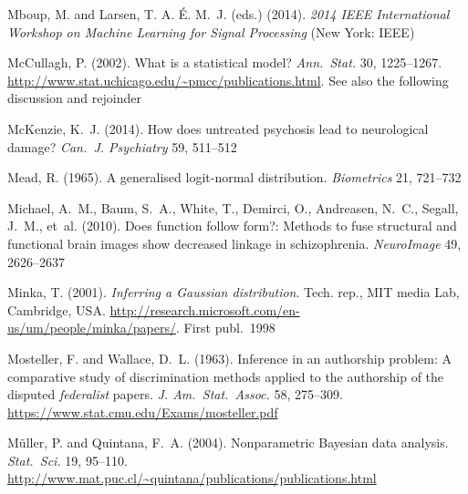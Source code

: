 \documentclass[%
]{frontiersSCNS-nologo} %
\newcommand*{\citebi}[2][]{\citet[#1]{#2}%
}
\newcommand*{\subtitleproc}[1]{}
\renewcommand*{\|}{\mathpunct{|}}%
\begin{document}
\begin{thebibliography}{156}
Mboup, M. and Larsen, T. A. {\'E}. M.~J. (eds.) (2014).
\newblock \emph{2014 IEEE International Workshop on Machine Learning for Signal
  Processing\subtitleproc{: September 21-24, Reims, France}} (New York: IEEE)

McCullagh, P. (2002).
\newblock What is a statistical model?
\newblock \emph{Ann.\ Stat.} 30, 1225--1267.
\newblock \url{http://www.stat.uchicago.edu/~pmcc/publications.html}. See also
  the following discussion and rejoinder \citebi{besagetal2002}

McKenzie, K.~J. (2014).
\newblock How does untreated psychosis lead to neurological damage?
\newblock \emph{Can.\ J. Psychiatry} 59, 511--512

Mead, R. (1965).
\newblock A generalised logit-normal distribution.
\newblock \emph{Biometrics} 21, 721--732

Michael, A.~M., Baum, S.~A., White, T., Demirci, O., Andreasen, N.~C., Segall,
  J.~M., et~al. (2010).
\newblock Does function follow form?: Methods to fuse structural and functional
  brain images show decreased linkage in schizophrenia.
\newblock \emph{NeuroImage} 49, 2626--2637

Minka, T. (2001).
\newblock \emph{Inferring a {Gaussian} distribution}.
\newblock Tech. rep., MIT media Lab, Cambridge, USA.
\newblock \url{http://research.microsoft.com/en-us/um/people/minka/papers/}.
  First publ.\ 1998

Mosteller, F. and Wallace, D.~L. (1963).
\newblock Inference in an authorship problem: {A} comparative study of
  discrimination methods applied to the authorship of the disputed
  {\emph{federalist}} papers.
\newblock \emph{J. Am.\ Stat.\ Assoc.} 58, 275--309.
\newblock \url{https://www.stat.cmu.edu/Exams/mosteller.pdf}

M{\"u}ller, P. and Quintana, F.~A. (2004).
\newblock Nonparametric {Bayesian} data analysis.
\newblock \emph{Stat.\ Sci.} 19, 95--110.
\newblock \url{http://www.mat.puc.cl/~quintana/publications/publications.html}


\end{thebibliography}
\end{document}
